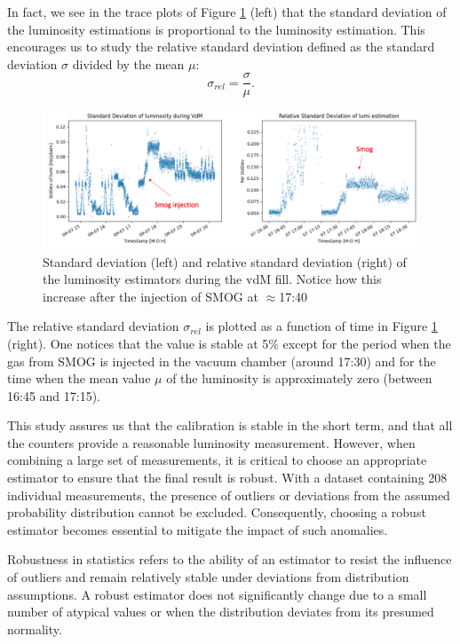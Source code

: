 In fact, we see in the trace plots of Figure \ref{fig:std_dev_rel_std} (left) that the standard deviation of the luminosity estimations is proportional to the luminosity estimation. This encourages us to study the relative standard deviation defined as the standard deviation $\sigma$  divided by the mean $\mu$:
\begin{equation}
    \sigma_{rel} = \frac{\sigma}{\mu} \label{rel_std}.
\end{equation}


\begin{figure}
    \centering
    \includegraphics[width=\textwidth]{figures/std_dev_and_rel_std.png}
    \caption{Standard deviation (left) and relative standard deviation (right) of the luminosity estimators during the vdM fill. Notice how this increase after the injection of SMOG at $\approx$17:40}
    \label{fig:std_dev_rel_std}
\end{figure}


The relative standard deviation $\sigma_{rel}$ is plotted as a function of time in Figure \ref{fig:std_dev_rel_std} (right). One notices that the value is stable at 5\% except for the period when the gas from SMOG is injected in the vacuum chamber (around 17:30) and for the time when the mean value $\mu$ of the luminosity is approximately zero (between 16:45 and 17:15).  

This study assures us that the calibration is stable in the short term, and that all the counters provide a reasonable luminosity measurement. However, when combining a large set of measurements, it is critical to choose an appropriate estimator to ensure that the final result is robust. With a dataset containing 208 individual measurements, the presence of outliers or deviations from the assumed probability distribution cannot be excluded. Consequently, choosing a robust estimator becomes essential to mitigate the impact of such anomalies.

Robustness in statistics refers to the ability of an estimator to resist the influence of outliers and remain relatively stable under deviations from distribution assumptions. A robust estimator does not significantly change due to a small number of atypical values or when the distribution deviates from its presumed normality.

